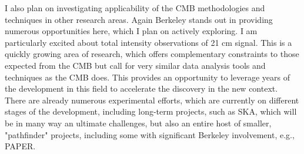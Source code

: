 \documentclass[11pt]{article}
\begin{document}
I also plan on investigating applicability of the CMB methodologies and techniques in other research areas. 
Again Berkeley stands out in providing numerous opportunities here, which I plan on actively exploring. 
I am particularly excited about total intensity observations of 21 cm signal. This is a quickly growing area of research, which
offers complementary constraints to those expected from the CMB but call for very similar data analysis tools and techniques as the CMB does. 
This provides an opportunity to leverage years of the development in this field to accelerate the discovery in the new context.
There are already numerous experimental efforts, which are currently on different stages of the development, including long-term projects,
such as SKA, which will be in many way an ultimate challenges, but also an entire host of smaller, "pathfinder" projects, including some
with significant Berkeley involvement, e.g., PAPER.
\end{document}
